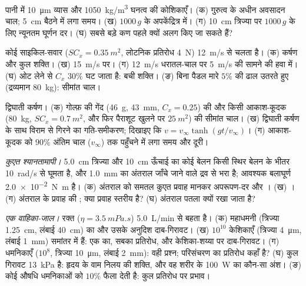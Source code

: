 \begin{exercise}[$\star\star$]\label{exo:b2:viscous-flows:6}
पानी में \qty{10}{\micro m} व्यास और \qty{1050}{kg/m^3} घनत्व की कोशिकाएँ।
(क) गुरुत्व के अधीन अवसादन चाल; \qty{5}{cm} बैठने में लगा समय। (ख)
$1000\,g$ के अपकेंद्रित्र में। (ग) \qty{10}{cm} त्रिज्या पर $1000\,g$ के लिए
न्यूनतम घूर्णन दर। (घ) सबसे बड़े कण पहले क्यों अलग किए जा सकते हैं?
\end{exercise}

\begin{exercise}[$\star\star$]\label{exo:b2:viscous-flows:7}
कोई साइकिल-सवार ($SC_x = \qty{0.35}{m^2}$, लोटनिक प्रतिरोध \qty{4}{N})
\qty{12}{m/s} से चलता है। (क) कर्षण और कुल शक्ति। (ख) \qty{15}{m/s} पर। (ग)
\qty{12}{m/s} धरातल-चाल पर \qty{5}{m/s} की सामने की हवा में। (घ) ओट लेने से
$C_x$ $30\%$ घट जाता है: बची शक्ति। (ङ) बिना पैडल मारे $5\%$ की ढाल उतरते हुए
(द्रव्यमान \qty{80}{kg}): सीमांत चाल।
\end{exercise}

\begin{exercise}[$\star\star$]\label{exo:b2:viscous-flows:8}
द्विघाती कर्षण। (क) गोल्फ़ की गेंद (\qty{46}{g}, \qty{43}{mm},
$C_x = 0.25$) की और किसी आकाश-कूदक (\qty{80}{kg}, $SC_x = \qty{0.7}{m^2}$, और फिर
पैराशूट खुलने पर $\qty{25}{m^2}$) की सीमांत चाल। (ख) द्विघाती कर्षण के साथ
विराम से गिरने का गति-समीकरण; दिखाइए कि $v = v_\infty\tanh(gt/v_\infty)$। (ग)
आकाश-कूदक को $90\%$ अंतिम चाल ($v_\infty$) तक पहुँचने में लगा समय और दूरी।
\end{exercise}

\begin{exercise}[$\star\star$]\label{exo:b2:viscous-flows:9}
\emph{कुएत श्यानतामापी।} \qty{5.0}{cm} त्रिज्या और \qty{10}{cm} ऊँचाई का कोई
बेलन किसी स्थिर बेलन के भीतर \qty{10}{rad/s} से घूमता है, और
\qty{1.0}{mm} का अंतराल जाँचे जाने वाले द्रव से भरा है; आवश्यक बलाघूर्ण
\qty{2.0e-2}{N.m} है। (क) अंतराल को समतल कुएत प्रवाह मानकर अपरूपण-दर
और । (ख) । (ग) अंतराल के प्रवाह की ;
क्या प्रवाह स्तरीय है? (घ) अंतराल पतला क्यों रखा जाता है?
\end{exercise}

\begin{exercise}[$\star\star\star$]\label{exo:b2:viscous-flows:10}
\emph{एक वाहिका-जाल।} रक्त ($\eta = \qty{3.5}{mPa.s}$) \qty{5.0}{L/min} से
बहता है। (क) महाधमनी (त्रिज्या \qty{1.25}{cm},
लंबाई \qty{40}{cm}) का  और उसके अनुदिश दाब-गिरावट। (ख) $10^{10}$
केशिकाएँ (त्रिज्या \qty{4}{\micro m}, लंबाई \qty{1}{mm}) समांतर में हैं:
एक का, सबका प्रतिरोध, और केशिका-शय्या पर दाब-गिरावट।
(ग) धमनिकाएँ ($10^8$, त्रिज्या \qty{10}{\micro m}, लंबाई
\qty{2}{mm}): वही प्रश्न; परिसंचरण का प्रतिरोध कहाँ है?
(घ) कुल गिरावट \qty{13}{kPa} है: हृदय के वाम निलय की शक्ति,
और वह शरीर के \qty{100}{W} का कौन-सा अंश। (ङ) कोई औषधि
धमनिकाओं को $10\%$ फैला देती है: कुल प्रतिरोध पर प्रभाव।
\end{exercise}

